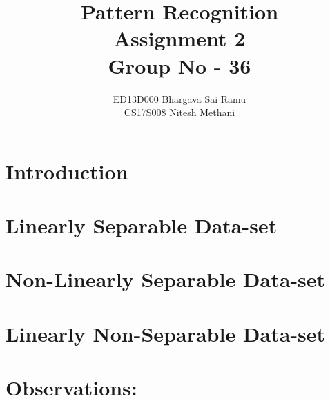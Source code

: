 \documentclass[a4paper]{article}
\title{Pattern Recognition\\
	Assignment 2\\
	Group No - 36 }
\author{ED13D000 Bhargava Sai Ramu\\
	CS17S008 Nitesh Methani}
\begin{document}
\maketitle
\hypersetup{linkcolor=black}
\tableofcontents


\section{Introduction}

\newpage



\section{Linearly Separable Data-set}


\section{Non-Linearly Separable Data-set}


\section{Linearly Non-Separable Data-set}

\newpage
\section{Observations:}







\end{document}
